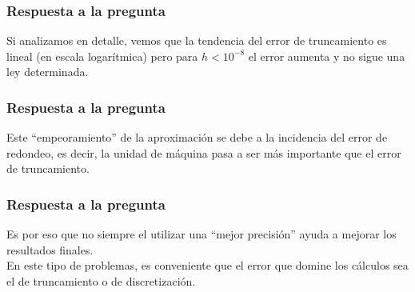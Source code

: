 \documentclass[12pt]{beamer}
\begin{document}
\begin{frame}
\frametitle{Respuesta a la pregunta}
Si analizamos en detalle, vemos que la tendencia del error de truncamiento es lineal (en escala logarítmica) pero para $h < 10^{-8}$ el error aumenta y no sigue una ley determinada. 
\end{frame}
\begin{frame}
\frametitle{Respuesta a la pregunta}
Este \enquote{empeoramiento} de la aproximación se debe a la incidencia del error de redondeo, es decir, la unidad de máquina pasa a ser más importante que el error de truncamiento.
\end{frame}
\begin{frame}
\frametitle{Respuesta a la pregunta}
Es por eso que no siempre el utilizar una \enquote{mejor precisión} ayuda a mejorar los resultados finales. 
\\
\bigskip
En este tipo de problemas, es conveniente que el error que domine los cálculos sea el de truncamiento o de discretización.
\end{frame}





\end{document}
